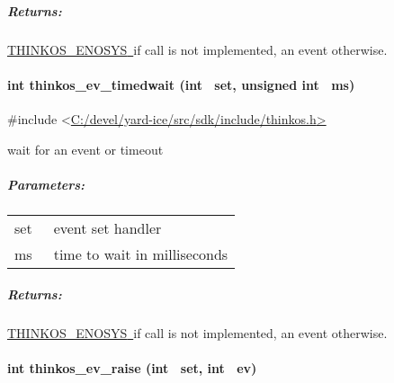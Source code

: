 {\subparagraph{\texorpdfstring{{Returns:}}{Returns:}}\label{returns-31}

{\protect\hyperlink{h.3s49zyc}{THINKOS\_ENOSYS}}{\protect\hyperlink{h.3s49zyc}{~}}{if
call is not implemented, an event otherwise. }

\paragraph{\texorpdfstring{{int thinkos\_ev\_timedwait (int ~set,
unsigned int
~ms)}}{int thinkos\_ev\_timedwait (int ~set, unsigned int ~ms)}}\label{int-thinkos_ev_timedwait-int-set-unsigned-int-ms}

{}

{\#include
\textless{}}{\protect\hyperlink{h.pkwqa1}{C:/devel/yard-ice/src/sdk/include/thinkos.h}}{\protect\hyperlink{h.pkwqa1}{\textgreater{}}}

{wait for an event or timeout }

{}

\subparagraph{\texorpdfstring{{Parameters:}}{Parameters:}}\label{parameters-28}

\protect\hypertarget{t.798629b4d033e81359313f6211f814d0e4c1651b}{}{}\protect\hypertarget{t.28}{}{}

\begin{longtable}[]{@{}ll@{}}
\toprule
\begin{minipage}[t]{0.47\columnwidth}\raggedright\strut
{set}{~}\strut
\end{minipage} & \begin{minipage}[t]{0.47\columnwidth}\raggedright\strut
{event set handler }\strut
\end{minipage}\tabularnewline
\begin{minipage}[t]{0.47\columnwidth}\raggedright\strut
{ms}{~}\strut
\end{minipage} & \begin{minipage}[t]{0.47\columnwidth}\raggedright\strut
{time to wait in milliseconds }\strut
\end{minipage}\tabularnewline
\bottomrule
\end{longtable}

\subparagraph{\texorpdfstring{{Returns:}}{Returns:}}\label{returns-32}

{\protect\hyperlink{h.3s49zyc}{THINKOS\_ENOSYS}}{\protect\hyperlink{h.3s49zyc}{~}}{if
call is not implemented, an event otherwise. }

\paragraph{\texorpdfstring{{int thinkos\_ev\_raise (int ~set, int
~ev)}}{int thinkos\_ev\_raise (int ~set, int ~ev)}}\label{int-thinkos_ev_raise-int-set-int-ev}

}
